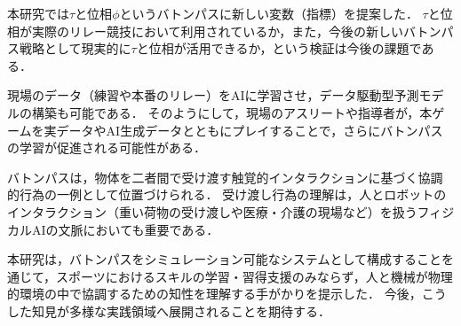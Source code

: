 \documentclass{jsai2e}
\newif\ifshowlabels
\newcommand{\tagtext}[3]{%
  \ifshowlabels
    \textcolor{#1}{#3\textsuperscript{\textsf{[#2]}}}%
  \else
    #3%
  \fi
}
\newcommand{\fix}[2]{\tagtext{fixred}{#1}{#2}}
\begin{document}
\fix{}{
本研究では$\tau$と位相$\phi$というバトンパスに新しい変数（指標）を提案した．
$\tau$と位相が実際のリレー競技において利用されているか，また，今後の新しいバトンパス戦略として現実的に$\tau$と位相が活用できるか，という検証は今後の課題である．
}

\fix{}{
現場のデータ（練習や本番のリレー）をAIに学習させ，データ駆動型予測モデルの構築も可能である．
そのようにして，現場のアスリートや指導者が，本ゲームを実データやAI生成データとともにプレイすることで，さらにバトンパスの学習が促進される可能性がある．
}

\fix{}{
バトンパスは，物体を二者間で受け渡す触覚的インタラクションに基づく協調的行為の一例として位置づけられる．
受け渡し行為の理解は，人とロボットのインタラクション（重い荷物の受け渡しや医療・介護の現場など）を扱うフィジカルAIの文脈においても重要である．
}

\fix{}{
本研究は，バトンパスをシミュレーション可能なシステムとして構成することを通じて，スポーツにおけるスキルの学習・習得支援のみならず，人と機械が物理的環境の中で協調するための知性を理解する手がかりを提示した．
今後，こうした知見が多様な実践領域へ展開されることを期待する．
}


\begin{acknowledgment}
\end{acknowledgment}




\begin{biography}

\end{biography}
\end{document}
